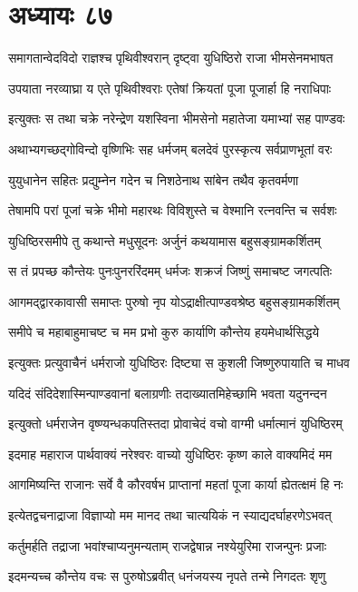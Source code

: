 \chapter{अध्यायः ८७}
\twolineshloka
{समागतान्वेदविदो राज्ञश्च पृथिवीश्वरान्}
{दृष्ट्वा युधिष्ठिरो राजा भीमसेनमभाषत}


\twolineshloka
{उपयाता नरव्याघ्रा य एते पृथिवीश्वराः}
{एतेषां क्रियतां पूजा पूजार्हा हि नराधिपाः}


\twolineshloka
{इत्युक्तः स तथा चक्रे नरेन्द्रेण यशस्विना}
{भीमसेनो महातेजा यमाभ्यां सह पाण्डवः}


\twolineshloka
{अथाभ्यगच्छद्गोविन्दो वृष्णिभिः सह धर्मजम्}
{बलदेवं पुरस्कृत्य सर्वप्राणभूतां वरः}


\twolineshloka
{युयुधानेन सहितः प्रद्युम्नेन गदेन च}
{निशठेनाथ सांबेन तथैव कृतवर्मणा}


\twolineshloka
{तेषामपि परां पूजां चक्रे भीमो महारथः}
{विविशुस्ते च वेश्मानि रत्नवन्ति च सर्वशः}


\twolineshloka
{युधिष्ठिरसमीपे तु कथान्ते मधुसूदनः}
{अर्जुनं कथयामास बहुसङ्ग्रामकर्शितम्}


\twolineshloka
{स तं प्रपच्छ कौन्तेयः पुनःपुनररिंदमम्}
{धर्मजः शक्रजं जिष्णुं समाचष्ट जगत्पतिः}


\twolineshloka
{आगमद्द्वारकावासी समाप्तः पुरुषो नृप}
{योऽद्राक्षीत्पाण्डवश्रेष्ठ बहुसङ्ग्रामकर्शितम्}


\twolineshloka
{समीपे च महाबाहुमाचष्ट च मम प्रभो}
{कुरु कार्याणि कौन्तेय हयमेधार्थसिद्धये}


\twolineshloka
{इत्युक्तः प्रत्युवाचैनं धर्मराजो युधिष्ठिरः}
{दिष्ट्या स कुशली जिष्णुरुपायाति च माधव}


\twolineshloka
{यदिदं संदिदेशास्मिन्पाण्डवानां बलाग्रणीः}
{तदाख्यातमिहेच्छामि भवता यदुनन्दन}


\twolineshloka
{इत्युक्तो धर्मराजेन वृष्ण्यन्धकपतिस्तदा}
{प्रोवाचेदं वचो वाग्मी धर्मात्मानं युधिष्ठिरम्}


\twolineshloka
{इदमाह महाराज पार्थवाक्यं नरेश्वरः}
{वाच्यो युधिष्ठिरः कृष्ण काले वाक्यमिदं मम}


\twolineshloka
{आगमिष्यन्ति राजानः सर्वे वै कौरवर्षभ}
{प्राप्तानां महतां पूजा कार्या ह्येतत्क्षमं हि नः}


\twolineshloka
{इत्येतद्वचनाद्राजा विज्ञाप्यो मम मानद}
{तथा चात्ययिकं न स्याद्यदर्घाहरणेऽभवत्}


\twolineshloka
{कर्तुमर्हति तद्राजा भवांश्चाप्यनुमन्यताम्}
{राजद्वेषान्न नश्येयुरिमा राजन्पुनः प्रजाः}


\twolineshloka
{इदमन्यच्च कौन्तेय वचः स पुरुषोऽब्रवीत्}
{धनंजयस्य नृपते तन्मे निगदतः शृणु}


